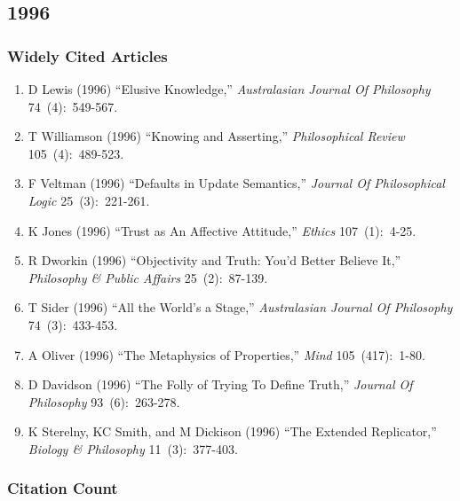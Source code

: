 \documentclass[
  10pt,
  letterpaper,
  DIV=11,
  numbers=noendperiod,
  twoside]{scrartcl}
\providecommand{\tightlist}{%
  \setlength{\itemsep}{0pt}\setlength{\parskip}{0pt}}\usepackage{longtable,booktabs,array}
\begin{document}
\newpage

\subsection{1996}\label{sec-s1996}

\subsubsection*{Widely Cited Articles}\label{widely-cited-articles-39}

\begin{enumerate}
\def\labelenumi{\arabic{enumi}.}
\tightlist
\item
  D Lewis (1996) ``Elusive Knowledge,'' \emph{Australasian Journal Of
  Philosophy} 74~(4):~549-567.
\item
  T Williamson (1996) ``Knowing and Asserting,'' \emph{Philosophical
  Review} 105~(4):~489-523.
\item
  F Veltman (1996) ``Defaults in Update Semantics,'' \emph{Journal Of
  Philosophical Logic} 25~(3):~221-261.
\item
  K Jones (1996) ``Trust as An Affective Attitude,'' \emph{Ethics}
  107~(1):~4-25.
\item
  R Dworkin (1996) ``Objectivity and Truth: You'd Better Believe It,''
  \emph{Philosophy \& Public Affairs} 25~(2):~87-139.
\item
  T Sider (1996) ``All the World's a Stage,'' \emph{Australasian Journal
  Of Philosophy} 74~(3):~433-453.
\item
  A Oliver (1996) ``The Metaphysics of Properties,'' \emph{Mind}
  105~(417):~1-80.
\item
  D Davidson (1996) ``The Folly of Trying To Define Truth,''
  \emph{Journal Of Philosophy} 93~(6):~263-278.
\item
  K Sterelny, KC Smith, and M Dickison (1996) ``The Extended
  Replicator,'' \emph{Biology \& Philosophy} 11~(3):~377-403.
\end{enumerate}

\subsubsection*{Citation Count}\label{sec-count-1996}
\end{document}
